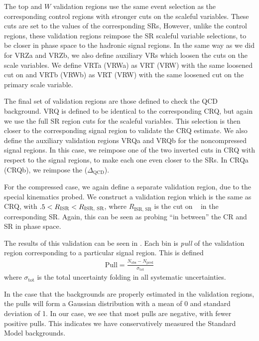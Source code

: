 The top and $W$ validation regions use the same event selection as the corresponding control regions with stronger cuts on the scaleful variables.
These cuts are set to the values of the corresponding SRs,
However, unlike the control regions, these validation regions reimpose the SR scaleful variable selections, to be closer in phase space to the hadronic signal regions.
In the same way as we did for VRZa and VRZb, we also define auxiliary VRs which loosen the cuts on the scale variables.
We define VRTa (VRWa) as VRT (VRW) with the same loosened cut on  and VRTb (VRWb) as VRT (VRW) with the same loosened cut on the primary scale variable.

The final set of validation regions are those defined to check the QCD background.
VRQ is defined to be identical to the corresponding CRQ, but again we use the full SR region cuts for the scaleful variables.
This selection is then closer to the corresponding signal region to validate the CRQ estimate.
We also define the auxiliary validation regions VRQa and VRQb for the noncompressed signal regions.
In this case, we reimpose one of the two inverted cuts in CRQ with respect to the signal regions, to make each one even closer to the SRs.
In CRQa (CRQb), we reimpose the  ($\Delta_{\mathrm{QCD}}$).

For the compressed case, we again define a separate validation region, due to the special kinematics probed.
We construct a validation region which is the same as CRQ, with $.5 < R_{\text{ISR}} < R_{\text{ISR, SR}}$, where $R_{\text{ISR, SR}}$ is the cut on \risr~ in the corresponding SR.
Again, this can be seen as probing ``in between'' the CR and SR in phase space.

The results of this validation can be seen in .
Each bin is \textit{pull} of the validation region corresponding to a particular signal region.
This is defined
\begin{align}
\text{Pull} = \frac{N_{\mathrm{obs}} - N_{\mathrm{pred}}}{\sigma_{\mathrm{tot}}}
\end{align}
where $\sigma_{\mathrm{tot}}$ is the total uncertainty folding in all systematic uncertainties.

In the case that the backgrounds are properly estimated in the validation regions, the pulls will form a Gaussian distribution with a mean of 0 and standard deviation of 1.
In our case, we see that most pulls are negative, with fewer positive pulls.
This indicates we have conservatively measured the Standard Model backgrounds.

